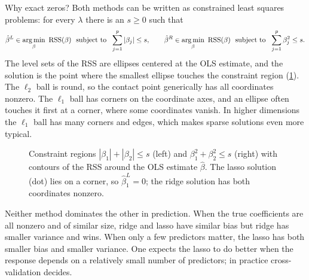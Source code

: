 Why exact zeros? Both methods can be written as constrained least squares problems: for every $\lambda$ there is an $s\ge0$ such that
\[
\hat\beta^L\in\argmin_\beta\ \mathrm{RSS}(\beta)\ \text{ subject to }\ \sum_{j=1}^p|\beta_j|\le s,
\qquad
\hat\beta^R\in\argmin_\beta\ \mathrm{RSS}(\beta)\ \text{ subject to }\ \sum_{j=1}^p\beta_j^2\le s .
\]
The level sets of the RSS are ellipses centered at the OLS estimate, and the solution is the point where the smallest ellipse touches the constraint region (\cref{fig:lasso-ridge}). The $\ell_2$ ball is round, so the contact point generically has all coordinates nonzero. The $\ell_1$ ball has corners on the coordinate axes, and an ellipse often touches it first at a corner, where some coordinates vanish. In higher dimensions the $\ell_1$ ball has many corners and edges, which makes sparse solutions even more typical.

\begin{figure}[ht]
\centering
{}
\caption{Constraint regions $|\beta_1|+|\beta_2|\le s$ (left) and $\beta_1^2+\beta_2^2\le s$ (right) with contours of the RSS around the OLS estimate $\hat\beta$. The lasso solution (dot) lies on a corner, so $\hat\beta^L_1=0$; the ridge solution has both coordinates nonzero.}
\label{fig:lasso-ridge}
\end{figure}

Neither method dominates the other in prediction. When the true coefficients are all nonzero and of similar size, ridge and lasso have similar bias but ridge has smaller variance and wins. When only a few predictors matter, the lasso has both smaller bias and smaller variance. One expects the lasso to do better when the response depends on a relatively small number of predictors; in practice cross-validation decides.

